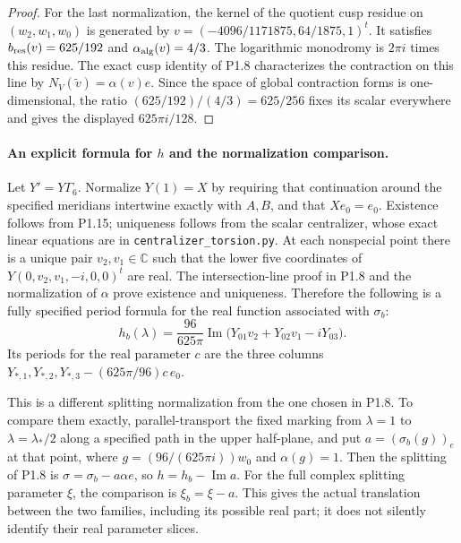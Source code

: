 \begin{proof}
For the last normalization, the kernel of the quotient cusp residue
on $(w_2,w_1,w_0)$ is generated by
$v=(-4096/1171875,64/1875,1)^t$.
It satisfies $b_{\rm res}(v)=625/192$ and
$\alpha_{\rm alg}(v)=4/3$.
The logarithmic monodromy is $2\pi i$ times this residue.
The exact cusp identity of P1.8 characterizes the contraction on this
line by $N_V(\widetilde v)=\alpha(v)e$.
Since the space of global contraction forms is one-dimensional, the
ratio $(625/192)/(4/3)=625/256$ fixes its scalar everywhere and gives
the displayed $625\pi i/128$.
\end{proof}

\paragraph{An explicit formula for $h$ and the normalization comparison.}
Let $Y'=Y\Gamma_6$.  Normalize $Y(1)=X$ by requiring that continuation
around the specified meridians intertwine exactly with $A,B$, and that
$Xe_0=e_0$.  Existence follows from P1.15; uniqueness follows from the
scalar centralizer, whose exact linear equations are in
\texttt{centralizer\_torsion.py}.
At each nonspecial point there is a unique pair $v_2,v_1\in\mathbb C$
such that the lower five coordinates of
$Y(0,v_2,v_1,-i,0,0)^t$ are real.
The intersection-line proof in P1.8 and the normalization of $\alpha$
prove existence and uniqueness.  Therefore the following is a fully
specified period formula for the real function associated with
$\sigma_b$:
\[
h_b(\lambda)=\frac{96}{625\pi}
 \operatorname{Im}\bigl(Y_{01}v_2+Y_{02}v_1-iY_{03}\bigr).
\tag{1.15.3}
\]
Its periods for the real parameter $c$ are the three columns
$Y_{*,1},Y_{*,2},Y_{*,3}-(625\pi/96)c\,e_0$.

This is a different splitting normalization from the one chosen in
P1.8.  To compare them exactly, parallel-transport the fixed marking
from $\lambda=1$ to $\lambda=\lambda_*/2$ along a specified path in the
upper half-plane, and put
$a=(\sigma_b(g))_e$ at that point, where
$g=(96/(625\pi i))w_0$ and $\alpha(g)=1$.
Then the splitting of P1.8 is
$\sigma=\sigma_b-a\alpha e$, so $h=h_b-\operatorname{Im}a$.
For the full complex splitting parameter $\xi$, the comparison is
$\xi_b=\xi-a$.  This gives the actual translation between the two
families, including its possible real part; it does not silently
identify their real parameter slices.

